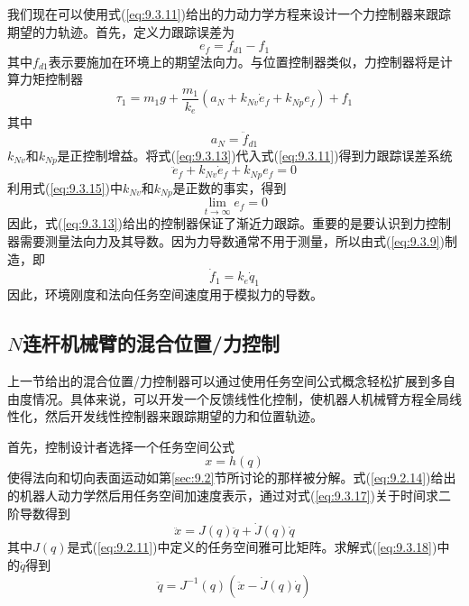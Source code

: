 \documentclass[12pt,a4paper]{ctexart}
\begin{document}
我们现在可以使用式(\ref{eq:9.3.11})给出的力动力学方程来设计一个力控制器来跟踪期望的力轨迹。首先，定义力跟踪误差为
\begin{equation}\label{eq:9.3.12}
e_f = f_{d1} - f_1
\end{equation}
其中$f_{d1}$表示要施加在环境上的期望法向力。与位置控制器类似，力控制器将是计算力矩控制器
\begin{equation}\label{eq:9.3.13}
\tau_1 = m_1g + \frac{m_1}{k_e}(a_N + k_{Nv}\dot{e}_f + k_{Np}e_f) + f_1
\end{equation}
其中
\begin{equation}\label{eq:9.3.14}
a_N = \ddot{f}_{d1}
\end{equation}
$k_{Nv}$和$k_{Np}$是正控制增益。将式(\ref{eq:9.3.13})代入式(\ref{eq:9.3.11})得到力跟踪误差系统
\begin{equation}\label{eq:9.3.15}
\ddot{e}_f + k_{Nv}\dot{e}_f + k_{Np}e_f = 0
\end{equation}
利用式(\ref{eq:9.3.15})中$k_{Nv}$和$k_{Np}$是正数的事实，得到
\[
\lim_{t \to \infty} e_f = 0
\]
因此，式(\ref{eq:9.3.13})给出的控制器保证了渐近力跟踪。重要的是要认识到力控制器需要测量法向力及其导数。因为力导数通常不用于测量，所以由式(\ref{eq:9.3.9})制造，即
\begin{equation}\label{eq:9.3.16}
\dot{f}_1 = k_e\dot{q}_1
\end{equation}
因此，环境刚度和法向任务空间速度用于模拟力的导数。

\subsection{$N$连杆机械臂的混合位置/力控制}

上一节给出的混合位置/力控制器可以通过使用任务空间公式概念轻松扩展到多自由度情况。具体来说，可以开发一个反馈线性化控制，使机器人机械臂方程全局线性化，然后开发线性控制器来跟踪期望的力和位置轨迹。

首先，控制设计者选择一个任务空间公式
\begin{equation}\label{eq:9.3.17}
x = h(q)
\end{equation}
使得法向和切向表面运动如第\ref{sec:9.2}节所讨论的那样被分解。式(\ref{eq:9.2.14})给出的机器人动力学然后用任务空间加速度表示，通过对式(\ref{eq:9.3.17})关于时间求二阶导数得到
\begin{equation}\label{eq:9.3.18}
\ddot{x} = J(q)\ddot{q} + \dot{J}(q)\dot{q}
\end{equation}
其中$J(q)$是式(\ref{eq:9.2.11})中定义的任务空间雅可比矩阵。求解式(\ref{eq:9.3.18})中的$\ddot{q}$得到
\begin{equation}\label{eq:9.3.19}
\ddot{q} = J^{-1}(q)(\ddot{x} - \dot{J}(q)\dot{q})
\end{equation}
\end{document}
